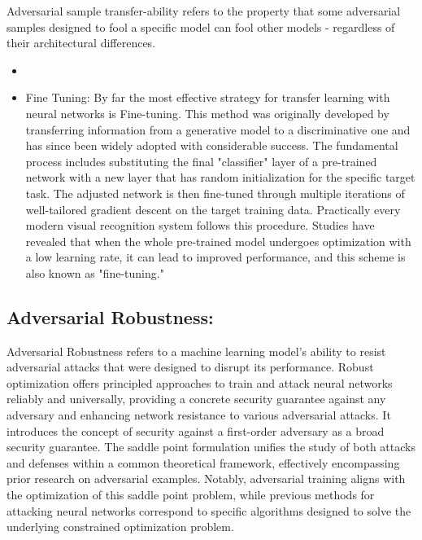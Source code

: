\documentclass{article}
\begin{document}
\setlength{\parskip}{10pt}
\begingroup
\raggedright
Adversarial sample transfer-ability refers to the property that some adversarial samples designed to fool a specific model can fool other models - regardless of their architectural differences. \cite{goodfellow2015explaining}
\endgroup

\begin{itemize}
    \item

		
\item
Fine Tuning:
By far the most effective strategy for transfer learning with neural networks is Fine-tuning.\cite{oquab2014learning} This method was originally developed by transferring information from a generative model to a discriminative one and has since been widely adopted with considerable success. The fundamental process includes substituting the final "classifier" layer of a pre-trained network with a new layer that has random initialization for the specific target task. The adjusted network is then fine-tuned through multiple iterations of well-tailored gradient descent on the target training data. Practically every modern visual recognition system follows this procedure. \cite{wang2019growing}
Studies have revealed that when the whole pre-trained model undergoes optimization with a low learning rate, it can lead to improved performance, and this scheme is also known as "fine-tuning." \cite{chin2021renofeation}
\end{itemize}

\subsection{Adversarial Robustness:} 
Adversarial Robustness refers to a machine learning model’s ability to resist adversarial attacks that were designed to disrupt its performance. 
Robust optimization offers principled approaches to train and attack neural networks reliably and universally, providing a concrete security guarantee against any adversary and enhancing network resistance to various adversarial attacks. It introduces the concept of security against a first-order adversary as a broad security guarantee. The saddle point formulation unifies the study of both attacks and defenses within a common theoretical framework, effectively encompassing prior research on adversarial examples. Notably, adversarial training aligns with the optimization of this saddle point problem, while previous methods for attacking neural networks correspond to specific algorithms designed to solve the underlying constrained optimization problem. \cite{madry2017towards}
\end{document}
